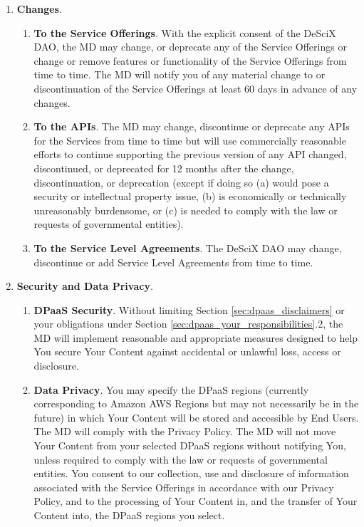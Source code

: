 \documentclass{article}
\begin{document}
\begin{enumerate}
    \item \textbf{Changes}.

    \begin{enumerate}
        \item \textbf{To the Service Offerings}. With the explicit consent of the DeSciX DAO, the MD may change, or deprecate any of the Service Offerings or change or remove features or functionality of the Service Offerings from time to time. The MD will notify you of any material change to or discontinuation of the Service Offerings at least 60 days in advance of any changes.
        
        \item \textbf{To the APIs}. The MD may change, discontinue or deprecate any APIs for the Services from time to time but will use commercially reasonable efforts to continue supporting the previous version of any API changed, discontinued, or deprecated for 12 months after the change, discontinuation, or deprecation (except if doing so (a) would pose a security or intellectual property issue, (b) is economically or technically unreasonably burdensome, or (c) is needed to comply with the law or requests of governmental entities).
        
        \item \textbf{To the Service Level Agreements}. The DeSciX DAO may change, discontinue or add Service Level Agreements from time to time.
    \end{enumerate}

    \item \textbf{Security and Data Privacy}.

    \begin{enumerate}
        \item \textbf{DPaaS Security}. Without limiting Section \ref{sec:dpaas_disclaimers} or your obligations under Section \ref{sec:dpaas_your_responsibilities}.2, the MD will implement reasonable and appropriate measures designed to help You secure Your Content against accidental or unlawful loss, access or disclosure.
        
        \item \textbf{Data Privacy}. You may specify the DPaaS regions (currently corresponding to Amazon AWS Regions but may not necessarily be in the future) in which Your Content will be stored and accessible by End Users. The MD will comply with the Privacy Policy. The MD will not move Your Content from your selected DPaaS regions without notifying You, unless required to comply with the law or requests of governmental entities. You consent to our collection, use and disclosure of information associated with the Service Offerings in accordance with our Privacy Policy, and to the processing of Your Content in, and the transfer of Your Content into, the DPaaS regions you select.
    \end{enumerate}


\end{enumerate}
\end{document}

